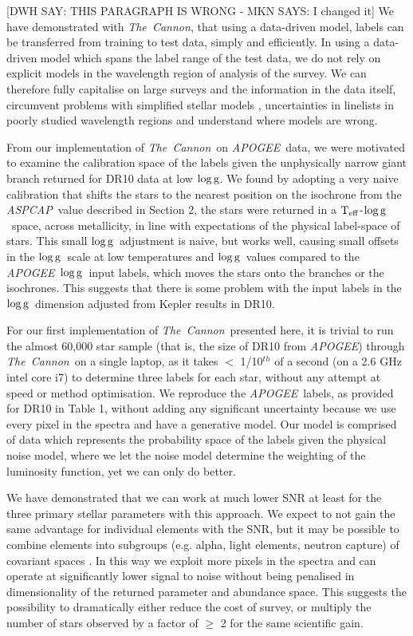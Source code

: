 \documentclass[12pt, preprint]{aastex}
\newcommand{\teff}{\mbox{$\rm T_{eff}$}}
\newcommand{\logg}{\mbox{$\rm \log g$}}
\newcommand{\tc}{\textsl{The~Cannon}}
\newcommand{\apogee}{\textsl{APOGEE}}
\newcommand{\aspcap}{\textsl{ASPCAP}}
\begin{document}
[DWH SAY: THIS PARAGRAPH IS WRONG - MKN SAYS: I changed it] We have demonstrated with \tc,  that using a data-driven model, labels can be transferred from training to test data, simply and efficiently. 
In using a data-driven model which spans the label range of the test data, we do not rely on explicit models in the wavelength region of analysis of the survey. 
We can therefore fully capitalise on large surveys and the information in the data itself, circumvent problems with simplified stellar models , uncertainties in linelists in poorly studied wavelength regions and understand where models are wrong.  

From our implementation of \tc\ on \apogee\ data, we were motivated to examine the calibration space of the labels given the unphysically narrow giant branch returned for DR10 data at low \logg. 
We found by adopting a very naive calibration that shifts the stars to the nearest position on the isochrone from the \aspcap\ value described in Section 2, the stars were returned in a \teff-\logg\ space, across metallicity, in line with expectations of the physical label-space of stars. 
This small \logg\ adjustment is naive, but works well, causing small offsets in the \logg\ scale at low temperatures and \logg\ values compared to the \apogee\ \logg\ input labels, which moves the stars onto the branches or the isochrones. 
This suggests that there is some problem with the input labels in the \logg\ dimension adjusted from Kepler results in DR10. 

For our first implementation of \tc\ presented here, it is trivial to run the almost 60,000 star sample (that is, the size of DR10 from \apogee) through \tc\ on a single laptop, as it takes $<$ 1/10$^{th}$ of a second (on a 2.6 GHz intel core i7) to determine three labels for each star, without any attempt at speed or method optimisation. 
We reproduce the \apogee\ labels, as provided for DR10 in Table 1, without adding any significant uncertainty because we use every pixel in the spectra and have a generative model. 
Our model is comprised of data which represents the probability space of the labels given the physical noise model,  where we let the noise model determine the weighting of the luminosity function, yet we can only do better. 

We have demonstrated that we can work at much lower SNR at least for the three primary stellar parameters with this approach. 
We expect to not gain the same advantage for individual elements with the SNR, but it may be possible to combine elements into subgroups (e.g. alpha, light elements, neutron capture) of covariant spaces \citep[e.g.][]{Ting2012}. In this way we exploit more pixels in the spectra and can operate at significantly lower signal to noise without being penalised in dimensionality of the returned parameter and abundance space. 
This suggests the possibility to dramatically either reduce the cost of survey, or multiply the number of stars observed by a factor of $\ge$ 2 for the same scientific gain. 
\end{document}
